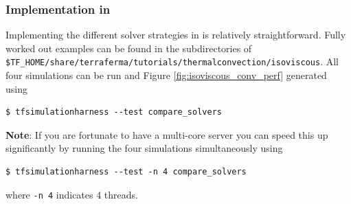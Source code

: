 \subsubsection*{Implementation in \TF}
\label{sec:implementation-tf}

Implementing the different solver strategies in \TF{} is relatively
straightforward. Fully worked out examples can be found in the
subdirectories of
\texttt{\$TF\_HOME/share/terraferma/tutorials/thermalconvection/isoviscous}. All
four simulations can be run and Figure \ref{fig:isoviscous_conv_perf}
generated using
\begin{lstlisting}[style=Bash]
  $ tfsimulationharness --test compare_solvers
\end{lstlisting} %
\textbf{Note}: If you are fortunate to have a multi-core server you
can speed this up significantly by running the four simulations
simultaneously using 
\begin{lstlisting}[style=Bash]
  $ tfsimulationharness --test -n 4 compare_solvers
\end{lstlisting} %
where \texttt{-n 4} indicates 4 threads.

